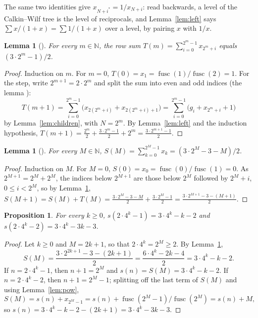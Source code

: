 \documentclass[11pt]{amsart}
\theoremstyle{plain}
\newtheorem{lemma}[theorem]{Lemma}
\newtheorem{proposition}[theorem]{Proposition}
\theoremstyle{definition}
\newcommand{\N}{\mathbb{N}}
\DeclareMathOperator{\fusc}{fusc}
\begin{document}
The same two identities give $x_{N+i^*}=1/x_{N+i}$: read backwards, a level of the Calkin--Wilf tree is the level of reciprocals, and Lemma~\ref{lem:left} says $\sum x/(1+x)=\sum 1/(1+x)$ over a level, by pairing $x$ with $1/x$.

\begin{lemma}[]\label{lem:row}
For every $m\in\N$, the row sum $T(m)=\sum_{i=0}^{2^m-1}x_{2^m+i}$ equals $(3\cdot2^m-1)/2$.
\end{lemma}

\begin{proof}
Induction on $m$. For $m=0$, $T(0)=x_1=\fusc(1)/\fusc(2)=1$. For the step, write $2^{m+1}=2\cdot2^m$ and split the sum into even and odd indices (the lemma ):
\[
  T(m+1)=\sum_{i=0}^{2^m-1}\bigl(x_{2(2^m+i)}+x_{2(2^m+i)+1}\bigr)=\sum_{i=0}^{2^m-1}\bigl(g_i+x_{2^m+i}+1\bigr)
\]
by Lemma~\ref{lem:children}, with $N=2^m$. By Lemma~\ref{lem:left} and the induction hypothesis, $T(m+1)=\frac{2^m}{2}+\frac{3\cdot2^m-1}{2}+2^m=\frac{3\cdot2^{m+1}-1}{2}$.
\end{proof}

\begin{lemma}[]\label{lem:prefix}
For every $M\in\N$, $S(M)=\sum_{k=0}^{2^M-1}x_k=(3\cdot2^M-3-M)/2$.
\end{lemma}

\begin{proof}
Induction on $M$. For $M=0$, $S(0)=x_0=\fusc(0)/\fusc(1)=0$. As $2^{M+1}=2^M+2^M$, the indices below $2^{M+1}$ are those below $2^M$ followed by $2^M+i$, $0\le i<2^M$, so by Lemma~\ref{lem:row}, $S(M+1)=S(M)+T(M)=\frac{3\cdot2^M-3-M}{2}+\frac{3\cdot2^M-1}{2}=\frac{3\cdot2^{M+1}-3-(M+1)}{2}$.
\end{proof}

\begin{proposition}\label{prop:values}
For every $k\ge0$, $s(2\cdot4^k-1)=3\cdot4^k-k-2$ and $s(2\cdot4^k-2)=3\cdot4^k-3k-3$.
\end{proposition}

\begin{proof}
Let $k\ge0$ and $M=2k+1$, so that $2\cdot4^k=2^M\ge2$. By Lemma~\ref{lem:prefix},
\[
  S(M)=\frac{3\cdot2^{2k+1}-3-(2k+1)}{2}=\frac{6\cdot4^k-2k-4}{2}=3\cdot4^k-k-2 .
\]
If $n=2\cdot4^k-1$, then $n+1=2^M$ and $s(n)=S(M)=3\cdot4^k-k-2$. If $n=2\cdot4^k-2$, then $n+1=2^M-1$; splitting off the last term of $S(M)$ and using Lemma~\ref{lem:pow},
\[
  S(M)=s(n)+x_{2^M-1}=s(n)+\fusc(2^M-1)/\fusc(2^M)=s(n)+M,
\]
so $s(n)=3\cdot4^k-k-2-(2k+1)=3\cdot4^k-3k-3$.
\end{proof}
\end{document}
